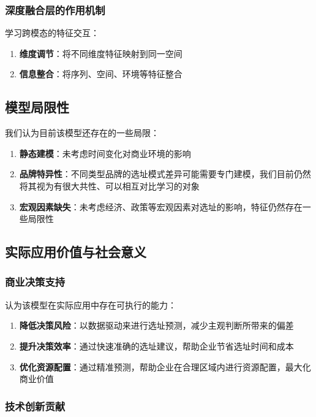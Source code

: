 \documentclass{article}
\begin{document}
\subsubsection{深度融合层的作用机制}

学习跨模态的特征交互：

\begin{enumerate}
\item \textbf{维度调节}：将不同维度特征映射到同一空间
\item \textbf{信息整合}：将序列、空间、环境等特征整合
\end{enumerate}

\subsection{模型局限性}

我们认为目前该模型还存在的一些局限：

\begin{enumerate}
\item \textbf{静态建模}：未考虑时间变化对商业环境的影响
\item \textbf{品牌特异性}：不同类型品牌的选址模式差异可能需要专门建模，我们目前仍然将其视为有很大共性、可以相互对比学习的对象
\item \textbf{宏观因素缺失}：未考虑经济、政策等宏观因素对选址的影响，特征仍然存在一些局限性
\end{enumerate}

\subsection{实际应用价值与社会意义}

\subsubsection{商业决策支持}

认为该模型在实际应用中存在可执行的能力：

\begin{enumerate}
\item \textbf{降低决策风险}：以数据驱动来进行选址预测，减少主观判断所带来的偏差
\item \textbf{提升决策效率}：通过快速准确的选址建议，帮助企业节省选址时间和成本
\item \textbf{优化资源配置}：通过精准预测，帮助企业在合理区域内进行资源配置，最大化商业价值
\end{enumerate}

\subsubsection{技术创新贡献}
\end{document}
